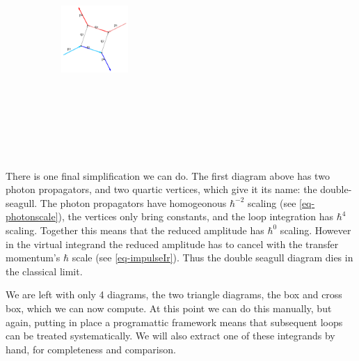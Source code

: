 \documentclass[
  10pt,
  a4paper,
  DIV=11,
  numbers=noendperiod,
  oneside]{scrreprt}
\DeclareRobustCommand{\[}{\begin{equation}}
\DeclareRobustCommand{\]}{\end{equation}}
\begin{document}
\begin{figure}
\begin{minipage}[t]{0.20\linewidth}
{\begin{figure}[H]
{}

\end{figure}

}

\end{minipage}%
%
\begin{minipage}[t]{0.20\linewidth}

{\centering 

\begin{figure}[H]

{\centering \includegraphics[width=1in,height=3.5in]{./scattering_files/figure-latex/dot-figure-2.png}

}

\end{figure}

}

\end{minipage}%

\end{figure}

There is one final simplification we can do. The first diagram above has
two photon propagators, and two quartic vertices, which give it its
name: the double-seagull. The photon propagators have homogeonous
\(\hbar^{-2}\) scaling (see \ref{eq-photonscale}), the vertices only
bring constants, and the loop integration has \(\hbar^4\) scaling.
Together this means that the reduced amplitude has \(\hbar^0\) scaling.
However in the virtual integrand the reduced amplitude has to cancel
with the transfer momentum's \(\hbar\) scale (see \ref{eq-impulseIr}).
Thus the double seagull diagram dies in the classical limit.

We are left with only 4 diagrams, the two triangle diagrams, the box and
cross box, which we can now compute. At this point we can do this
manually, but again, putting in place a programattic framework means
that subsequent loops can be treated systematically. We will also extract one of these integrands
by hand, for completeness and comparison.
\end{document}
